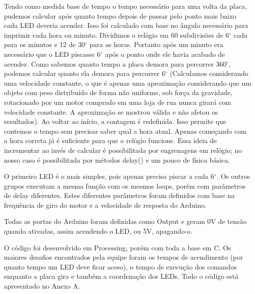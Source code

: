 Tendo como medida base de tempo o tempo necessário para uma volta da placa, pudemos calcular após quanto tempo depois de passar pelo ponto mais baixo cada LED deveria acender. Isso foi calculado com base no ângulo necessário para imprimir cada hora ou minuto. Dividimos o relógio em 60 subdivisões de 6$^\circ$ cada para os minutos e 12 de 30$^\circ$ para as horas. Portanto após um minuto era necessário que o LED piscasse 6$^\circ$ após o ponto onde ele havia acabado de acender. Como sabemos quanto tempo a placa demora para percorrer 360$^\circ$, podemos calcular quanto ela demora para percorrer 6$^\circ$ (Calculamos considerando uma velocidade constante, o que é apenas uma aproximação considerando que um objeto com peso distribuído de forma não uniforme, sob força da gravidade, rotacionado por um motor comprado em uma loja de rua nunca girará com velocidade constante. A aproximação se mostrou válida e não afetou os resultados). Ao voltar ao início, a contagem é redefinida. Isso permite que contemos o tempo sem precisar saber qual a hora atual. Apenas começando com a hora correta já é suficiente para que o relógio funcione. Essa ideia de incrementar ao invés de calcular é possibilitada por engrenagens em relógio; no nosso caso é possibilitada por métodos delay() e um pouco de física básica.

O primeiro LED é o mais simples, pois apenas precisa piscar a cada 6$^\circ$. Os outros grupos executam a mesma função com os mesmos loops, porém com parâmetros de delay diferentes. Estes diferentes parâmetros foram definidos com base na frequência de giro do motor e a velocidade de resposta do Arduino.

Todas as portas do Arduino foram definidas como Output e geram 0V de tensão quando ativadas, assim acendendo o LED, ou 5V, apagando-o.

O código foi desenvolvido em Processing, porém com toda a base em C. Os maiores desafios encontrados pela equipe foram os tempos de acendimento (por quanto tempo um LED deve ficar aceso), o tempo de execução dos comandos enquanto a placa gira e também a coordenação dos LEDs. Todo o código está apresentado no Anexo A.